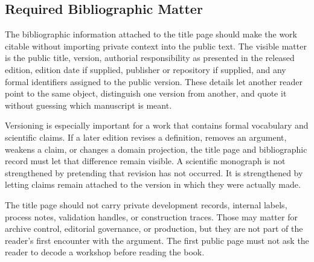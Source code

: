 \documentclass[11pt,a4paper,openany]{book}
\begin{document}
\subsection{Required Bibliographic Matter}
The bibliographic information attached to the title page should make the work citable without importing private context into the public text. The visible matter is the public title, version, authorial responsibility as presented in the released edition, edition date if supplied, publisher or repository if supplied, and any formal identifiers assigned to the public version. These details let another reader point to the same object, distinguish one version from another, and quote it without guessing which manuscript is meant. \cite{stauffer_percolation,grimmett_percolation}\par
Versioning is especially important for a work that contains formal vocabulary and scientific claims. If a later edition revises a definition, removes an argument, weakens a claim, or changes a domain projection, the title page and bibliographic record must let that difference remain visible. A scientific monograph is not strengthened by pretending that revision has not occurred. It is strengthened by letting claims remain attached to the version in which they were actually made.\par
The title page should not carry private development records, internal labels, process notes, validation handles, or construction traces. Those may matter for archive control, editorial governance, or production, but they are not part of the reader's first encounter with the argument. The first public page must not ask the reader to decode a workshop before reading the book.\par
\end{document}
